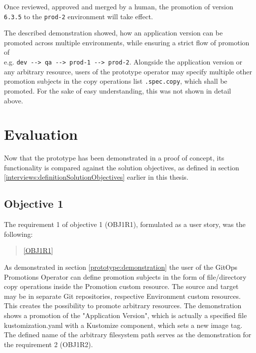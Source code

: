 Once reviewed, approved and merged by a human,
the promotion of version \lstinline|6.3.5| to the \lstinline|prod-2| environment
will take effect.

The described demonstration showed,
how an application version can be promoted across multiple environments,
while ensuring a strict flow of promotion of \\
e.g. \lstinline|dev --> qa --> prod-1 --> prod-2|.
Alongside the application version or any arbitrary resource,
users of the prototype operator may specify multiple other
promotion subjects in the copy operations list \lstinline|.spec.copy|, which shall be promoted.
For the sake of easy understanding, this was not shown in detail above.



























\section{Evaluation}

Now that the prototype has been demonstrated in a proof of concept,
its functionality is compared against the solution objectives,
as defined in section
\ref{interviews:definitionSolutionObjectives}
earlier in this thesis.

\subsection*{Objective 1}

The requirement 1 of objective 1 (OBJ1R1), formulated as a user story,
was the following:

\begin{quotation}
	\noindent
	\ref{OBJ1R1}
\end{quotation}

As demonstrated in section
\ref{prototype:demonstration}
the user of the GitOps Promotions Operator can define promotion subjects
in the form of file/directory copy operations inside the Promotion custom resource.
The source and target may be in separate Git repositories, respective Environment custom resources.
This creates the possibility to promote arbitrary resources.
The demonstration shows a promotion of the "Application Version",
which is actually a specified file kustomization.yaml with a Kustomize component,
which sets a new image tag.
The defined name of the arbitrary filesystem path serves as the demonstration for the requirement 2 (OBJ1R2).

